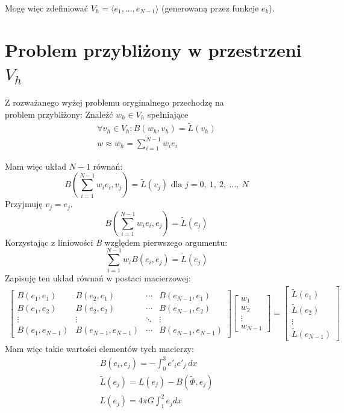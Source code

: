 \documentclass{article}
\begin{document}
\noindent
Mogę więc zdefiniować \(V_h = \langle e_1, \ldots, e_{N-1} \rangle\) (generowaną przez funkcje \(e_k\)).

\section{Problem przybliżony w przestrzeni \(V_h\)}

Z rozważanego wyżej problemu oryginalnego przechodzę na\\
problem przybliżony: Znaleźć \(w_h \in V_h\) spełniające
\begin{gather*}
    \forall v_h \in V_h : B(w_h, v_h) = \tilde{L}(v_h)\\
    w \approx w_h = \sum_{i=1}^{N-1} w_i e_i
\end{gather*}

\noindent
Mam więc układ \(N-1\) równań:
\[B \left(\sum_{i=1}^{N-1} w_i e_i, v_j \right) = \tilde{L}(v_j) \text{ dla } j = 0,\ 1,\ 2,\ \ldots,\ N\]
Przyjmuję \(v_j = e_j\).
\[B \left(\sum_{i=1}^{N-1} w_i e_i, e_j \right) = \tilde{L}(e_j)\]
Korzystając z liniowości \textit{B} względem pierwszego argumentu:
\[\sum_{i=1}^{N-1} w_i B(e_i, e_j) = \tilde{L}(e_j)\]
Zapisuję ten układ równań w postaci macierzowej:
\begin{gather*}
    \begin{bmatrix}
        B(e_1, e_1) & B(e_2, e_1) & \cdots & B(e_{N-1}, e_1)\\
        B(e_1, e_2) & B(e_2, e_2) & \cdots & B(e_{N-1}, e_2)\\
        \vdots & \vdots & \ddots & \vdots\\
        B(e_1, e_{N-1}) & B(e_{N-1}, e_{N-1}) & \cdots & B(e_{N-1}, e_{N-1})
    \end{bmatrix}
    \begin{bmatrix}
        w_1 \\ w_2 \\ \vdots \\ w_{N-1}
    \end{bmatrix}
    =
    \begin{bmatrix}
        \tilde{L}(e_1) \\ \tilde{L}(e_2) \\ \vdots \\ \tilde{L}(e_{N-1})
    \end{bmatrix}
\end{gather*}
\noindent
Mam więc takie wartości elementów tych macierzy:
\begin{gather*}
    B(e_i, e_j) = -\int_0^3 e'_i e'_j\ dx\\
    \tilde{L}(e_j) = L(e_j) - B(\tilde{\Phi}, e_j)\\
    L(e_j) = 4 \pi G \int_1^2 e_j dx
\end{gather*}
\end{document}
